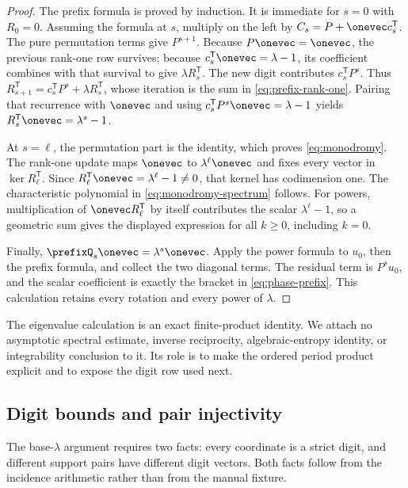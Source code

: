 \documentclass[11pt,letterpaper]{article}
\theoremstyle{definition}
\theoremstyle{remark}
\numberwithin{equation}{section}
\begin{document}
\begin{proof}
The prefix formula is proved by induction.  It is immediate for \(s=0\)
with \(R_0=0\).  Assuming the formula at \(s\), multiply on the left by
\(C_s=P+\onevec c_s^{\mathsf T}\).  The pure permutation terms give
\(P^{s+1}\).  Because \(P\onevec=\onevec\), the previous rank-one row
survives; because \(c_s^{\mathsf T}\onevec=\lambda-1\), its coefficient
combines with that survival to give \(\lambda R_s^{\mathsf T}\).  The new
digit contributes \(c_s^{\mathsf T}P^s\).  Thus
\(R_{s+1}^{\mathsf T}=c_s^{\mathsf T}P^s+\lambda R_s^{\mathsf T}\), whose
iteration is the sum in \eqref{eq:prefix-rank-one}.  Pairing that recurrence
with \(\onevec\) and using
\(c_s^{\mathsf T}P^s\onevec=\lambda-1\) yields
\(R_s^{\mathsf T}\onevec=\lambda^s-1\).

At \(s=\ell\), the permutation part is the identity, which proves
\eqref{eq:monodromy}.  The rank-one update maps \(\onevec\) to
\(\lambda^\ell\onevec\) and fixes every vector in
\(\ker R_\ell^{\mathsf T}\).  Since
\(R_\ell^{\mathsf T}\onevec=\lambda^\ell-1\neq0\), that kernel has
codimension one.  The characteristic polynomial in
\eqref{eq:monodromy-spectrum} follows.  For powers, multiplication of
\(\onevec R_\ell^{\mathsf T}\) by itself contributes the scalar
\(\lambda^\ell-1\), so a geometric sum gives the displayed expression for
all \(k\geq0\), including \(k=0\).

Finally, \(\prefixQ_s\onevec=\lambda^s\onevec\).  Apply the power formula
to \(u_0\), then the prefix formula, and collect the two diagonal terms.  The
residual term is \(P^su_0\), and the scalar coefficient is exactly the
bracket in \eqref{eq:phase-prefix}.  This calculation retains every rotation
and every power of \(\lambda\).
\end{proof}

The eigenvalue calculation is an exact finite-product identity.  We attach
no asymptotic spectral estimate, inverse reciprocity, algebraic-entropy
identity, or integrability conclusion to it.  Its role is to make the
ordered period product explicit and to expose the digit row used next.

\subsection{Digit bounds and pair injectivity}

The base-\(\lambda\) argument requires two facts: every coordinate is a
strict digit, and different support pairs have different digit vectors.
Both facts follow from the incidence arithmetic rather than from the manual
fixture.
\end{document}
